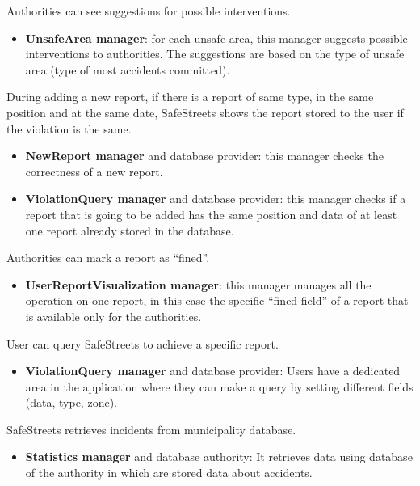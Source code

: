 \documentclass[../RASD.tex]{subfiles}
\begin{document}
\begin{enumerate}
         Authorities can see suggestions for possible interventions.
        \begin{itemize}
            \item \textbf{UnsafeArea manager}: for each unsafe area, this manager suggests possible interventions to authorities.
            The suggestions are based on the type of unsafe area (type of most accidents committed).
        \end{itemize}

         During adding a new report, if there is a report of same type, in the same position and at the same date,
        SafeStreets shows the report stored to the user if the violation is the same.
        \begin{itemize}
            \item \textbf{NewReport manager} and database provider: this manager checks the correctness of a new report.
            \item \textbf{ViolationQuery manager} and database provider: this manager checks if a report that is going to be added has the same position
            and data of at least one report already stored in the database.
        \end{itemize}

         Authorities can mark a report as “fined”.
        \begin{itemize}
            \item \textbf{UserReportVisualization manager}: this manager manages all the operation on one report, in this case the specific “fined field”
            of a report that is available only for the authorities.
        \end{itemize}

         User can query SafeStreets to achieve a specific report.
        \begin{itemize}
            \item \textbf{ViolationQuery manager} and database provider: Users have a dedicated area in the application where they can make a query
            by setting different fields (data, type, zone).
        \end{itemize}

         SafeStreets retrieves incidents from municipality database.
        \begin{itemize}
            \item \textbf{Statistics manager} and database authority: It retrieves data using database of the authority in which are stored data about accidents.
        \end{itemize}
    \end{enumerate}
\end{document}
